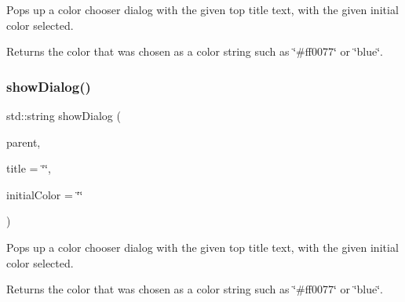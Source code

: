 Pops up a color chooser dialog with the given top title text, with the given initial color selected. 

Returns the color that was chosen as a color string such as \char`\"{}\#ff0077\char`\"{} or \char`\"{}blue\char`\"{}. \mbox{\label{classGColorChooser_ab17d15e0eeebb06c853c197a63949d13}} 
\subsubsection{\texorpdfstring{show\+Dialog()}{showDialog()}\hspace{0.1cm}{\footnotesize\ttfamily [6/6]}}
{\footnotesize\ttfamily std\+::string show\+Dialog (\begin{DoxyParamCaption}\item[{Q\+Widget $\ast$}]{parent,  }\item[{const std\+::string \&}]{title = {\ttfamily \char`\"{}\char`\"{}},  }\item[{const std\+::string \&}]{initial\+Color = {\ttfamily \char`\"{}\char`\"{}} }\end{DoxyParamCaption})\hspace{0.3cm}{\ttfamily [static]}}



Pops up a color chooser dialog with the given top title text, with the given initial color selected. 

Returns the color that was chosen as a color string such as \char`\"{}\#ff0077\char`\"{} or \char`\"{}blue\char`\"{}. 